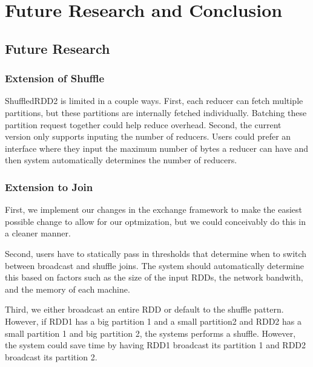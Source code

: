 \chapter{Future Research and Conclusion}

\section{Future Research}

\subsection{Extension of Shuffle}

ShuffledRDD2 is limited in a couple ways. First, each reducer can fetch multiple partitions, but these partitions are internally fetched individually. Batching these partition request together could help reduce overhead. Second, the current version only supports inputing the number of reducers. Users could prefer
an interface where they input the maximum number of bytes a reducer can have and then system automatically determines the 
number of reducers.

\subsection {Extension to Join}

First, we implement our changes in the exchange framework to make the easiest possible change to allow for our optmization,
but we could conceivably do this in a cleaner manner.

Second, users have to statically pass in thresholds that determine when to switch between broadcast and
shuffle joins. The system should automatically determine this based on factors such as the size of the input RDDs,
the network bandwith, and the memory of each machine.

Third, we either broadcast an entire RDD or default to the shuffle pattern. However, if RDD1 has a big partition 1 and
a small partition2 and RDD2 has a small partition 1 and big partition 2, the systems performs a shuffle. However, the system could save time
by having RDD1 broadcast its partition 1 and RDD2 broadcast its partition 2.

